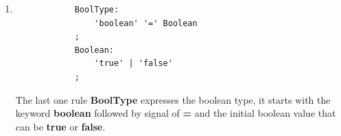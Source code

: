 \begin{enumerate}
	\item
		\singlespacing
		\begin{listing}[H]
		\begin{verbatim}
			BoolType:
				'boolean' '=' Boolean
			;
			Boolean:
				'true' | 'false' 
			;
		\end{verbatim}
		\label{listing:modelRule}
		\end{listing}

		The last one rule {\bf BoolType} expresses the boolean type, it starts with
		the keyword {\bf boolean} followed by signal of \textbf{=} and the initial
		boolean	value that can be {\bf true} or {\bf false}.

\end{enumerate}
